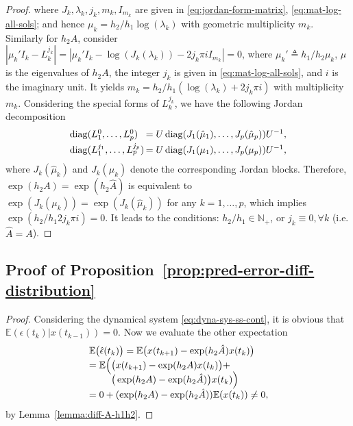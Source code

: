 \documentclass[letterpaper,10pt,journal,final]{IEEEtran}
\theoremstyle{definition}
\theoremstyle{remark}
\newcommand{\diag}{\operatorname{diag}}
\begin{document}
\begin{proof}
  where $J_k, \lambda_k, j_k, m_k, I_{m_k}$ are given in
  \eqref{eq:jordan-form-matrix}, \eqref{eq:mat-log-all-sols}; and hence
  $\mu_k = h_2/h_1 \log(\lambda_k)$ with geometric multiplicity $m_k$. Similarly for
  $h_2A$, consider
  $|\mu_k' I_k - L_k^{j_k}| = |\mu_k' I_k - \log(J_k(\lambda_k)) - 2 j_k \pi i
  I_{m_k}| = 0$, where $\mu_k' \triangleq h_1/h_2 \mu_k$, $\mu$ is the eigenvalues of
  $h_2A$, the integer $j_k$ is given in \eqref{eq:mat-log-all-sols}, and $i$ is the
  imaginary unit. It yields $m_k = h_2/h_1 (\log(\lambda_k) + 2j_k \pi i )$ with
  multiplicity $m_k$. Considering the special forms of $L_k^{j_k}$, we
  have the following Jordan decomposition
  \begin{displaymath}
    \begin{array}{l@{\,}l}
      \diag(L_1^0, \dots, L_p^0) &= U \diag(J_1(\hat{\mu}_1), \dots,
                                   J_p(\hat{\mu}_p)) U^{-1}, \\[1mm]
      \diag(L_1^{j_1}, \dots, L_p^{j_p}) &= U \diag(J_1({\mu}_1), \dots,
                                           J_p({\mu}_p)) U^{-1},
    \end{array}
  \end{displaymath}
  where $J_k(\hat{\mu}_k)$ and $J_k(\mu_k)$ denote the corresponding Jordan blocks.
  Therefore, $\exp(h_2 A) = \exp(h_2 \hat{A})$ is equivalent to $\exp(J_k(\mu_k)) =
  \exp(J_k(\hat{\mu}_k))$ for any $k = 1,\dots,p$, which implies $\exp(h_2/h_1
  2j_k\pi i) = 0$. It leads to the conditions: $h_2/h_1 \in \mathbb{N}_+$, or $j_k
  \equiv 0, \forall k$ (i.e. $\hat{A} = A$).
\end{proof}


\subsection{Proof of Proposition~\ref{prop:pred-error-diff-distribution}}
\label{appdix:subsec:proof-prop-pred-err-diff-dist}

\begin{proof}
  Considering the dynamical system \eqref{eq:dyna-sys-ss-cont}, it is obvious that
  $\mathbb{E}(\epsilon(t_k)|x(t_{k-1})) = 0$. Now we evaluate the other expectation
  \begin{displaymath}
    \begin{array}{l@{\,}l}
      &\mathbb{E}\big(\hat{\epsilon}(t_k) \big) = \mathbb{E}\big(x(t_{k+1}) - \exp(h_2 \hat{A})x(t_k)\big)\\
      &= \mathbb{E}\Big(
        \begin{array}[t]{@{}l@{}l}
          &\big(x(t_{k+1}) - \exp(h_2 A)x(t_k) \big) +\\
          &\big( \exp(h_2A) - \exp(h_2 \hat{A}) \big) x(t_k) \Big)
        \end{array}\\
      &= 0 + (\exp(h_2A) - \exp(h_2 \hat{A})) \mathbb{E}(x(t_k)) \neq 0,
    \end{array}
  \end{displaymath}
  by Lemma~\ref{lemma:diff-A-h1h2}.
\end{proof}
\end{document}
